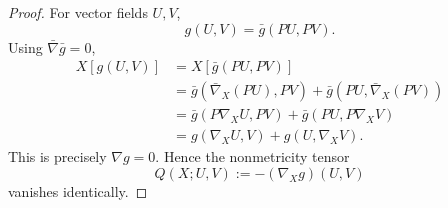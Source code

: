 \documentclass[10pt,a4paper]{amsart}
\begin{document}
\begin{proof}
For vector fields \(U,V\),
\[
 g(U,V)=\bar g(PU,PV).
\]
Using \(\bar\nabla\bar g=0\),
\begin{align*}
 X[g(U,V)]
 &=X[\bar g(PU,PV)]\\
 &=\bar g(\bar\nabla_X(PU),PV)
   +\bar g(PU,\bar\nabla_X(PV))\\
 &=\bar g(P\nabla_XU,PV)+\bar g(PU,P\nabla_XV)\\
 &=g(\nabla_XU,V)+g(U,\nabla_XV).
\end{align*}
This is precisely \(\nabla g=0\).  Hence the nonmetricity tensor
\[
 Q(X;U,V):=-(\nabla_Xg)(U,V)
\]
vanishes identically.
\end{proof}
\end{document}
